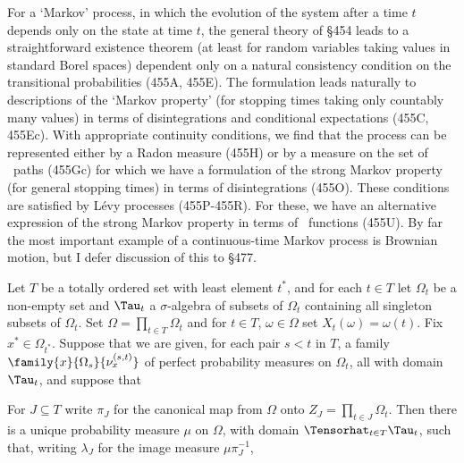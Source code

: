 
\def\mucdlg{\mu_{\text{cdlg}}}
\def\rti{right-{\vthsp}translation-{\vthsp}invariant}

\def\chaptername{Perfect measures, disintegrations and processes}
\def\sectionname{Markov and L\'evy processes}


For a `Markov' process, in which the evolution of the system after a
time $t$ depends only on the state at time $t$, the general theory of
\S454 leads
to a straightforward existence theorem (at least for random variables
taking values in standard Borel spaces) dependent only on a natural
consistency condition on the transitional probabilities (455A, 455E).
The formulation leads naturally to descriptions of the `Markov property'
(for stopping times taking only countably many values) in
terms of disintegrations and conditional expectations (455C, 455Ec).
With appropriate continuity conditions, we find that the process can be
represented either by a Radon measure (455H) or
by a measure on the set of \cadlag\ paths (455Gc) for which we
have a formulation of the strong Markov property (for general
stopping times) in terms of disintegrations
(455O).   These conditions are satisfied by L\'evy processes
(455P-455R).  %
For these, we have an alternative expression of the strong Markov property
in terms of \imp\ functions (455U).
By far the most important example of a continuous-time Markov process is
Brownian motion, but I defer discussion of this to \S477.

 Let $T$ be a totally ordered set with least
element $t^*$, and for each $t\in T$ let $\Omega_t$ be a
non-empty set and $\Tau_t$ a
$\sigma$-algebra of subsets of $\Omega_t$ containing all singleton subsets
of $\Omega_t$.   Set $\Omega=\prod_{t\in T}\Omega_t$ and for $t\in T$,
$\omega\in\Omega$ set $X_t(\omega)=\omega(t)$.
Fix $x^*\in\Omega_{t^*}$.   Suppose that we are given, for each
pair $s<t$ in $T$, a family $\family{x}{\Omega_s}{\nu^{(s,t)}_x}$ of
perfect probability measures on $\Omega_t$, all with domain $\Tau_t$,
and suppose that


\noindent For $J\subseteq T$ write $\pi_J$ for the canonical map from
$\Omega$ onto $Z_J=\prod_{t\in J}\Omega_t$.
Then there is a unique probability measure $\mu$ on $\Omega$,
with domain $\Tensorhat_{t\in T}\Tau_t$, such that, writing
$\lambda_J$ for the image measure $\mu\pi_J^{-1}$,

